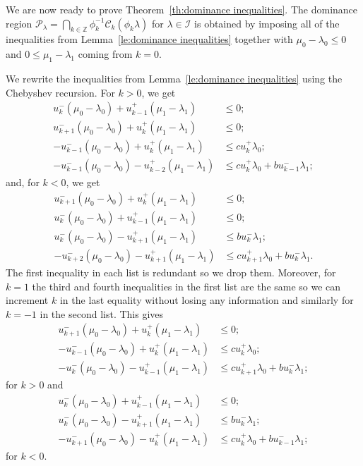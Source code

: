\documentclass{amsart}
\numberwithin{theorem}{section}
\newcommand{\cC}{\mathcal{C}}
\newcommand{\cI}{\mathcal{I}}
\newcommand{\cP}{\mathcal{P}}
\newcommand{\ZZ}{\mathbb{Z}}
\begin{document}
  We are now ready to prove Theorem~\ref{th:dominance inequalities}.
  The dominance region $\cP_\lambda=\bigcap_{k\in\ZZ}\phi_k^{-1}\cC_k(\phi_k\lambda)$ for $\lambda\in\cI$ is obtained by imposing all of the inequalities from Lemma~\ref{le:dominance inequalities} together with $\mu_0 -\lambda_0 \le 0$ and $0 \le \mu_1 - \lambda_1$ coming from $k=0$.

  We rewrite the inequalities from Lemma~\ref{le:dominance inequalities} using the Chebyshev recursion.
  For $k>0$, we get
  \begin{align*}
    u_k^-(\mu_0-\lambda_0)+u_{k-1}^+(\mu_1-\lambda_1) &\le 0;\\
    u_{k+1}^-(\mu_0-\lambda_0)+u_k^+(\mu_1-\lambda_1) &\le 0;\\
    -u_{k-1}^-(\mu_0-\lambda_0)+u_k^+(\mu_1-\lambda_1) &\le cu_k^+\lambda_0;\\
    -u_{k-1}^-(\mu_0-\lambda_0)-u_{k-2}^+(\mu_1-\lambda_1) &\le cu_k^+\lambda_0+bu_{k-1}^-\lambda_1;
  \end{align*}
  and, for $k<0$, we get
  \begin{align*}
    u_{k+1}^-(\mu_0-\lambda_0)+u_k^+(\mu_1-\lambda_1) &\le 0;\\
    u_k^-(\mu_0-\lambda_0)+u_{k-1}^+(\mu_1-\lambda_1) &\le 0;\\
    u_k^-(\mu_0-\lambda_0)-u_{k+1}^+(\mu_1-\lambda_1) &\le bu_k^-\lambda_1;\\
    -u_{k+2}^-(\mu_0-\lambda_0)-u_{k+1}^+(\mu_1-\lambda_1) &\le cu_{k+1}^+\lambda_0+bu_k^-\lambda_1.
  \end{align*}
  The first inequality in each list is redundant so we drop them.
  Moreover, for $k=1$ the third and fourth inequalities in the first list are the same so we can increment $k$ in the last equality without losing any information and similarly for $k=-1$ in the second list. 
  This gives
  \begin{align*}
    u_{k+1}^-(\mu_0-\lambda_0)+u_k^+(\mu_1-\lambda_1) &\le 0;\\
    -u_{k-1}^-(\mu_0-\lambda_0)+u_k^+(\mu_1-\lambda_1) &\le cu_k^+\lambda_0;\\
    -u_k^-(\mu_0-\lambda_0)-u_{k-1}^+(\mu_1-\lambda_1) &\le cu_{k+1}^+\lambda_0+bu_k^-\lambda_1;
  \end{align*}
  for $k>0$ and
  \begin{align*}
    u_k^-(\mu_0-\lambda_0)+u_{k-1}^+(\mu_1-\lambda_1) &\le 0;\\
    u_k^-(\mu_0-\lambda_0)-u_{k+1}^+(\mu_1-\lambda_1) &\le bu_k^-\lambda_1;\\
    -u_{k+1}^-(\mu_0-\lambda_0)-u_k^+(\mu_1-\lambda_1) &\le cu_k^+\lambda_0+bu_{k-1}^-\lambda_1;
  \end{align*}
  for $k<0$.
\end{document}
